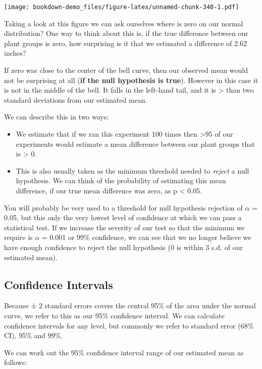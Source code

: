 \documentclass[
]{book}
\begin{document}
\texttt{[image: bookdown-demo\_files/figure-latex/unnamed-chunk-340-1.pdf]}

Taking a look at this figure we can ask ourselves where is zero on our normal distribution? One way to think about this is, if the true difference between our plant groups is zero, how surprising is it that we estimated a difference of 2.62 inches?

If zero was close to the center of the bell curve, then our observed mean would not be surprising at all (\textbf{if the null hypothesis is true}). However in this case it is not in the middle of the bell. It falls in the left-hand tail, and it is \textgreater{} than two standard deviations from our estimated mean.

We can describe this in two ways:

\begin{itemize}
\item
  We estimate that if we ran this experiment 100 times then \textgreater95 of our experiments would estimate a mean difference between our plant groups that is \textgreater{} 0.
\item
  This is also usually taken as the minimum threshold needed to \emph{reject} a null hypothesis. We can think of the probability of estimating this mean difference, if our true mean difference was zero, as p \textless{} 0.05.
\end{itemize}

You will probably be very used to a threshold for null hypothesis rejection of \(\alpha\) = 0.05, but this only the very lowest level of confidence at which we can pass a statistical test. If we increase the severity of our test so that the minimum we require is \(\alpha\) = 0.001 or 99\% confidence, we can see that we no longer believe we have enough confidence to reject the null hypothesis (0 is within 3 s.d. of our estimated mean).

\hypertarget{confidence-intervals}{%
\subsection{Confidence Intervals}\label{confidence-intervals}}

Because ± 2 standard errors covers the central 95\% of the area under the normal curve, we refer to this as our 95\% confidence interval. We can calculate confidence intervals for any level, but commonly we refer to standard error (68\% CI), 95\% and 99\%.

We can work out the 95\% confidence interval range of our estimated mean as follows:
\end{document}
